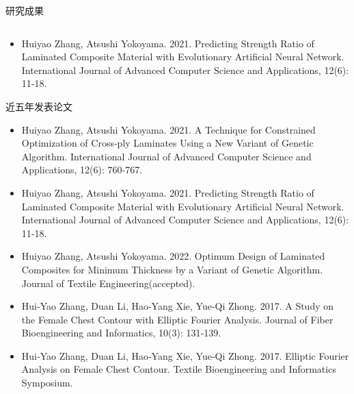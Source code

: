 \documentclass{beamer}
\begin{document}
\begin{frame}{研究成果}
	\begin{columns}
		\begin{column}{0.6\textwidth}
			
		\end{column}
	\end{columns}
	\begin{center}
		\begin{itemize}
			\item Huiyao Zhang, Atsushi Yokoyama. 2021. Predicting Strength Ratio of Laminated Composite Material with Evolutionary
				Artificial Neural Network. International Journal of Advanced Computer Science and Applications, 12(6): 11‑18.
		\end{itemize}
	\end{center}
\end{frame}


\begin{frame}{近五年发表论文}
	\begin{center}
	\begin{itemize}
\item \small Huiyao Zhang, Atsushi Yokoyama. 2021. A Technique for Constrained Optimization of Cross‐ply Laminates Using a New Variant of Genetic Algorithm. International Journal of Advanced Computer Science and Applications, 12(6): 760‐767.
\item \small Huiyao Zhang, Atsushi Yokoyama. 2021. Predicting Strength Ratio of Laminated Composite Material with Evolutionary Artificial Neural Network. International Journal of Advanced Computer Science and Applications, 12(6): 11‐18.
	\item \small Huiyao Zhang, Atsushi Yokoyama. 2022. Optimum Design of Laminated Composites for Minimum Thickness by a Variant of Genetic Algorithm. Journal of Textile Engineering(accepted).
\item \small Hui‐Yao Zhang, Duan Li, Hao‐Yang Xie, Yue‐Qi Zhong. 2017. A Study on the Female Chest Contour with Elliptic Fourier Analysis. Journal of Fiber Bioengineering and Informatics, 10(3): 131‐139.
\item \small Hui‐Yao Zhang, Duan Li, Hao‐Yang Xie, Yue‐Qi Zhong. 2017. Elliptic Fourier Analysis on Female Chest Contour. Textile Bioengineering and Informatics Symposium.
	\end{itemize}
	\end{center}
\end{frame}
\end{document}
